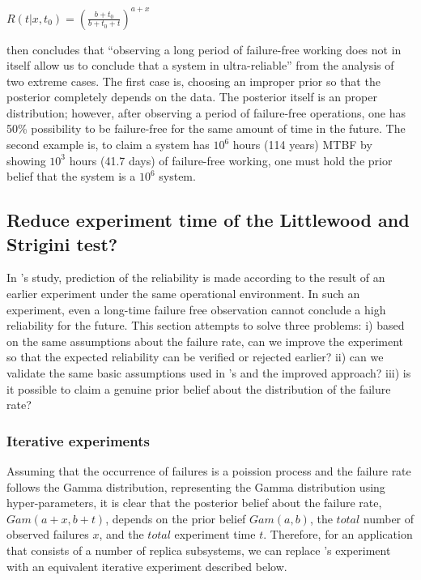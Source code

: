 \documentclass[12pt, authoryear]{article}
\begin{document}
$ R(t | x, t_0) = \left ( \frac{b+t_0}{b+t_0+t} \right ) ^{a+x} $


\citeauthor{Littlewood93} then concludes that ``observing a long period of 
failure-free working does not in itself allow us to conclude that a system in 
ultra-reliable'' from the analysis of two extreme cases. 
The first case is, choosing an improper prior so that the posterior completely 
depends on the data.  The posterior itself is an proper distribution; however, 
after observing a period of failure-free operations, one has 50\% possibility 
to be failure-free for the same amount of time in the future.  The second 
example is, to claim a system has $10^6$ hours (114 years) MTBF by showing 
$10^3$ hours (41.7 days) of failure-free working, one must hold the prior 
belief that the system is a $10^6$ system.


\subsection {Reduce experiment time of the Littlewood and Strigini 
 test?}\label{iterative}

In \citeauthor{Littlewood93}'s study, prediction of the reliability is made 
according to the result of an earlier experiment under the same 
operational environment.  In such an experiment, even a long-time failure free 
observation cannot conclude a high reliability for the future. This section 
attempts to solve three problems: i) based on the same assumptions about the 
failure rate, can we improve the experiment so that the expected reliability 
can be verified or rejected earlier? ii) can we validate 
the same basic assumptions used in \citeauthor{Littlewood93}'s and the improved 
approach?  iii) is it possible to claim a genuine prior belief about the 
distribution of the failure rate?


\subsubsection{Iterative experiments}

Assuming that the occurrence of failures is a poission process and the failure 
rate follows the Gamma distribution, representing the Gamma distribution using 
hyper-parameters, it is clear that the posterior belief about the failure rate, 
$Gam(a+x, b+t)$, depends on the prior belief $Gam(a,b)$, the 
$total$ number of observed failures $x$, and the $total$ 
experiment time $t$.  Therefore, for an application that consists of a number 
of replica subsystems, we can replace \citeauthor{Littlewood93}'s experiment 
with an equivalent iterative experiment described below.
\end{document}
